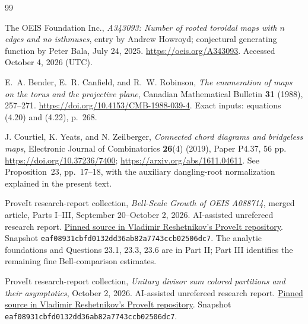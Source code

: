 \documentclass[11pt,letterpaper]{article}
\numberwithin{equation}{section}
\theoremstyle{definition}
\theoremstyle{remark}
\begin{document}
\clearpage
\begingroup
\raggedright
{}
{}
\begin{thebibliography}{99}

The OEIS Foundation Inc., \emph{A343093: Number of rooted toroidal maps
with $n$ edges and no isthmuses}, entry by Andrew Howroyd; conjectural
generating function by Peter Bala, July 24, 2025.
\url{https://oeis.org/A343093}. Accessed October 4, 2026 (UTC).

E.~A. Bender, E.~R. Canfield, and R.~W. Robinson,
\emph{The enumeration of maps on the torus and the projective plane},
Canadian Mathematical Bulletin \textbf{31} (1988), 257--271.
\url{https://doi.org/10.4153/CMB-1988-039-4}.
Exact inputs: equations (4.20) and (4.22), p.~268.

J. Courtiel, K. Yeats, and N. Zeilberger,
\emph{Connected chord diagrams and bridgeless maps},
Electronic Journal of Combinatorics \textbf{26}(4) (2019), Paper P4.37,
56 pp. \url{https://doi.org/10.37236/7400};
\url{https://arxiv.org/abs/1611.04611}.
See Proposition~23, pp.~17--18, with the auxiliary dangling-root
normalization explained in the present text.

ProveIt research-report collection,
\emph{Bell-Scale Growth of OEIS A088714}, merged article, Parts I--III,
September 20--October 2, 2026. AI-assisted unrefereed research report.
\href{https://github.com/VladimirReshetnikov/ProveIt/blob/eaf08931cbfd0132dd36ab82a7743ccb02506dc7/SetTheory/Cardinals/docs/reports/generating-functions-and-asymptotics/oeis-sequence-asymptotics/a088714-bell-scale-growth/article.tex}{Pinned source in Vladimir Reshetnikov's ProveIt repository}.
Snapshot \texttt{eaf08931cbfd0132dd36ab82a7743ccb02506dc7}.
The analytic foundations and Questions 23.1, 23.3, 23.6 are in Part II;
Part III identifies the remaining fine Bell-comparison estimates.

ProveIt research-report collection,
\emph{Unitary divisor sum colored partitions and their asymptotics},
October 2, 2026. AI-assisted unrefereed research report.
\href{https://github.com/VladimirReshetnikov/ProveIt/blob/eaf08931cbfd0132dd36ab82a7743ccb02506dc7/SetTheory/Cardinals/docs/reports/generating-functions-and-asymptotics/oeis-sequence-asymptotics/a301981-unitary-divisor-partitions/article.tex}{Pinned source in Vladimir Reshetnikov's ProveIt repository}.
Snapshot \texttt{eaf08931cbfd0132dd36ab82a7743ccb02506dc7}.


\end{thebibliography}
\endgroup
\end{document}
